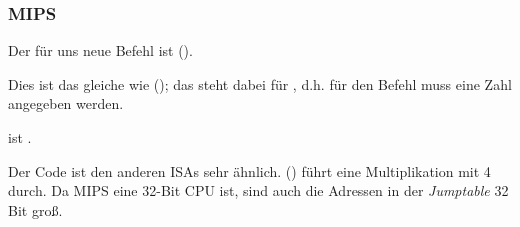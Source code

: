 \subsubsection{MIPS}



Der für uns neue Befehl ist  ().

Dies ist das gleiche wie  (); das  steht dabei für , d.h.
für den Befehl muss eine Zahl angegeben werden. 

 ist .

Der Code ist den anderen \ac{ISA}s sehr ähnlich.
 () führt eine Multiplikation mit 4 durch.
Da MIPS eine 32-Bit CPU ist, sind auch die Adressen in der \emph{Jumptable} 32 Bit groß.